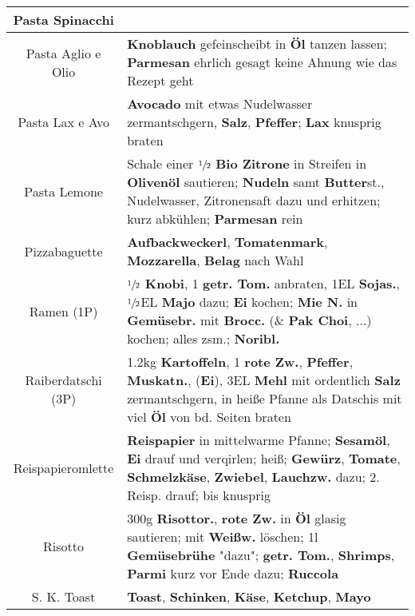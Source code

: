 \documentclass{article}
\begin{document}
\begin{tabular}{c|l}
        Pasta Spinacchi & \\\hline

        Pasta Aglio e Olio & \textbf{Knoblauch} gefeinscheibt in \textbf{Öl} tanzen lassen; \textbf{Parmesan} ehrlich gesagt keine Ahnung wie das Rezept geht\\\hline

        Pasta Lax e Avo & \textbf{Avocado} mit etwas Nudelwasser zermantschgern, \textbf{Salz}, \textbf{Pfeffer}; \textbf{Lax} knusprig braten\\\hline

        Pasta Lemone & Schale einer $\sfrac{1}{2}$ \textbf{Bio Zitrone} in Streifen in \textbf{Olivenöl} sautieren; \textbf{Nudeln} samt \textbf{Butter}st., Nudelwasser, Zitronensaft dazu und erhitzen; kurz abkühlen; \textbf{Parmesan} rein\\\hline

        Pizzabaguette & \textbf{Aufbackweckerl}, \textbf{Tomatenmark}, \textbf{Mozzarella}, \textbf{Belag} nach Wahl\\\hline

        Ramen {\scriptsize(1P)} & $\sfrac{1}{2}$ \textbf{Knobi}, 1 \textbf{getr. Tom.} anbraten, 1EL \textbf{Sojas.}, $\sfrac{1}{2}$EL \textbf{Majo} dazu; \textbf{Ei} kochen; \textbf{Mie N.} in \textbf{Gemüsebr.} mit \textbf{Brocc.} (\& \textbf{Pak Choi}, ...) kochen; alles zsm.; \textbf{Noribl.}\\\hline

        Raiberdatschi {\scriptsize(3P)}& 1.2kg \textbf{Kartoffeln}, 1 \textbf{rote Zw.}, \textbf{Pfeffer}, \textbf{Muskatn.}, (\textbf{Ei}), 3EL \textbf{Mehl} mit ordentlich \textbf{Salz} zermantschgern, in heiße Pfanne als Datschis mit viel \textbf{Öl} von bd. Seiten braten\\\hline

        Reispapieromlette & \textbf{Reispapier} in mittelwarme Pfanne; \textbf{Sesamöl}, \textbf{Ei} drauf und verqirlen; heiß; \textbf{Gewürz}, \textbf{Tomate}, \textbf{Schmelzkäse}, \textbf{Zwiebel}, \textbf{Lauchzw.} dazu; 2. Reisp. drauf; bis knusprig\\\hline

        Risotto & 300g \textbf{Risottor.}, \textbf{rote Zw.} in \textbf{Öl} glasig sautieren; mit \textbf{Weißw.} löschen; 1l \textbf{Gemüsebrühe} "dazu"; \textbf{getr. Tom.}, \textbf{Shrimps}, \textbf{Parmi} kurz vor Ende dazu; \textbf{Ruccola}\\\hline
		
		S. K. Toast&\textbf{Toast}, \textbf{Schinken}, \textbf{Käse}, \textbf{Ketchup}, \textbf{Mayo}\\\hline		
		

\end{tabular}
\end{document}

